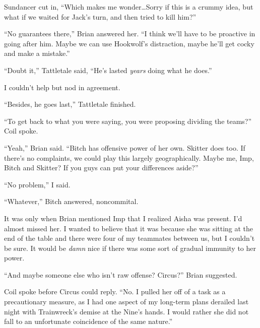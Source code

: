 Sundancer cut in, ``Which makes me wonder\ldots  Sorry if this is a crummy idea, but what if we waited for Jack's turn, and then tried to kill him?''



``No guarantees there,'' Brian answered her.  ``I think we'll have to be proactive in going after him.  Maybe we can use Hookwolf's distraction, maybe he'll get cocky and make a mistake.''



``Doubt it,'' Tattletale said, ``He's lasted \emph{years} doing what he does.''



I couldn't help but nod in agreement.



``Besides, he goes last,'' Tattletale finished.



``To get back to what you were saying, you were proposing dividing the teams?'' Coil spoke.



``Yeah,'' Brian said.  ``Bitch has offensive power of her own.  Skitter does too.  If there's no complaints, we could play this largely geographically.  Maybe me, Imp, Bitch and Skitter?  If you guys can put your differences aside?''



``No problem,'' I said.



``Whatever,'' Bitch answered, noncommital.



It was only when Brian mentioned Imp that I realized Aisha was present.  I'd almost missed her.  I wanted to believe that it was because she was sitting at the end of the table and there were four of my teammates between us, but I couldn't be sure.  It would be \emph{damn} nice if there was some sort of gradual immunity to her power.



``And maybe someone else who isn't raw offense?  Circus?''  Brian suggested.



Coil spoke before Circus could reply.  ``No.  I pulled her off of a task as a precautionary measure, as I had one aspect of my long-term plans derailed last night with Trainwreck's demise at the Nine's hands.  I would rather she did not fall to an unfortunate coincidence of the same nature.''



